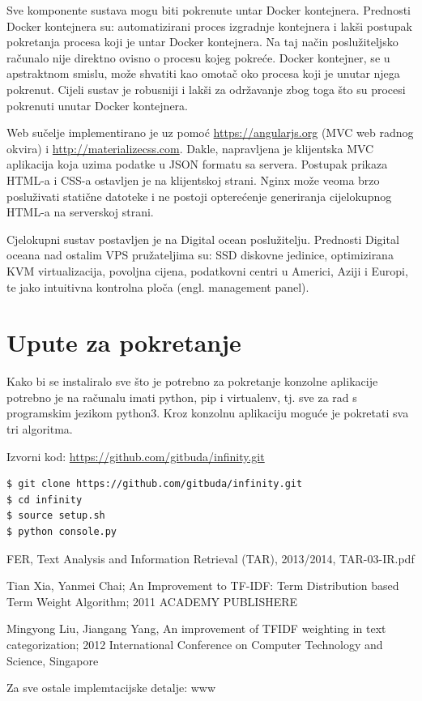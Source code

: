 \documentclass[a4paper,12pt]{article}
\begin{document}
\vspace{0.3cm}

Sve komponente sustava mogu biti pokrenute untar Docker kontejnera. Prednosti Docker kontejnera su: automatizirani proces izgradnje kontejnera i lakši postupak pokretanja procesa koji je untar Docker kontejnera. Na taj način poslužiteljsko računalo nije direktno ovisno o procesu kojeg pokreće. Docker kontejner, se u apstraktnom smislu, može shvatiti kao omotač oko procesa koji je unutar njega pokrenut. Cijeli sustav je robusniji i lakši za održavanje zbog toga što su procesi pokrenuti unutar Docker kontejnera.

Web sučelje implementirano je uz pomoć \url{https://angularjs.org} (MVC web radnog okvira) i \url{http://materializecss.com}. Dakle, napravljena je klijentska MVC aplikacija koja uzima podatke u JSON formatu sa servera. Postupak prikaza HTML-a i CSS-a ostavljen je na klijentskoj strani. Nginx može veoma brzo posluživati statične datoteke i ne postoji opterećenje generiranja cijelokupnog HTML-a na serverskoj strani.

Cjelokupni sustav postavljen je na Digital ocean poslužitelju. Prednosti Digital oceana nad ostalim VPS pružateljima su: SSD diskovne jedinice, optimizirana KVM virtualizacija, povoljna cijena, podatkovni centri u Americi, Aziji i Europi, te jako intuitivna kontrolna ploča (engl. management panel).

\section{Upute za pokretanje}

Kako bi se instaliralo sve što je potrebno za pokretanje konzolne aplikacije potrebno je na računalu imati python, pip i virtualenv, tj. sve za rad s programskim jezikom python3. Kroz konzolnu aplikaciju moguće je pokretati sva tri algoritma.

Izvorni kod: \url{https://github.com/gitbuda/infinity.git}

\begin{lstlisting}[language=bash]
$ git clone https://github.com/gitbuda/infinity.git
$ cd infinity
$ source setup.sh
$ python console.py
\end{lstlisting}

\begin{thebibliography}{9}

FER, Text Analysis and Information Retrieval (TAR), 2013/2014, TAR-03-IR.pdf

Tian Xia, Yanmei Chai; An Improvement to TF-IDF: Term Distribution based Term Weight Algorithm; 2011 ACADEMY PUBLISHERE

Mingyong Liu, Jiangang Yang, An improvement of TFIDF weighting in text categorization; 2012 International Conference on Computer Technology and Science, Singapore

Za sve ostale implemtacijske detalje: www

\end{thebibliography}
\end{document}

